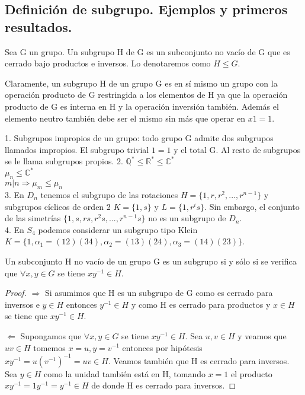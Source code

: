 \subsection{Definición de subgrupo. Ejemplos y primeros resultados.}

\begin{ndef}
Sea G un grupo. Un subgrupo H de G es un subconjunto no vacío de G que es cerrado bajo productos e inversos. Lo denotaremos como $H \le G$.
\end{ndef}

Claramente, un subgrupo H de un grupo G es en sí mismo un grupo con la operación producto de G restringida a los elementos de H ya que la operación producto de G es interna en H y la operación inversión también. Además el elemento neutro también debe ser el mismo sin más que operar en $x 1 = 1$.

\begin{ejemplo}
1. Subgrupos impropios de un grupo: todo grupo G admite dos subgrupos llamados impropios. El subgrupo trivial $1 = {1}$ y el total G. Al resto de subgrupos se le llama subgrupos propios.
2. $\mathbb{Q}^{*} \le \mathbb{R}^{*} \le \mathbb{C}^{*}$\\
$\mu_n \le \mathbb{C}^{*}$\\
$m|n \Rightarrow \mu_m \le \mu_n$\\
3. En $D_n$ tenemos el subgrupo de las rotaciones $H = \{1,r,r^2,...,r^{n-1}\}$ y subgrupos cíclicos de orden 2 $K = \{1,s\}$ y $L = \{1,r^is\}$. Sin embargo, el conjunto de las simetrías $\{1,s,rs,r^2s,...,r^{n-1}s\}$ no es un subgrupo de $D_n$.\\
4. En $S_4$ podemos considerar un subgrupo tipo Klein $K = \{1,\alpha_1 = (12)(34),\alpha_2=(13)(24),\alpha_3=(14)(23)\}$.
\end{ejemplo}

\begin{nprop}\label{proposition:criterio-subgrupo}
Un subconjunto H no vacío de un grupo G es un subgrupo si y sólo si se verifica que
$\forall x,y \in G$ se tiene $xy^{-1} \in H$.
\end{nprop}

\begin{proof}
$\Rightarrow$ Si asumimos que H es un subgrupo de G como es cerrado para inversos e $y \in H$ entonces $y^{-1} \in H$ y como H es cerrado para productos y $x \in H$ se tiene que $xy^{-1} \in H$.

$\Leftarrow$ Supongamos que $\forall x,y \in G$ se tiene $xy^{-1} \in H$. Sea $u,v \in H$ y veamos que $uv \in H$ tomemos $x = u,y = v^{-1}$ entonces por hipótesis $xy^{-1} = u(v^{-1})^{-1} = uv \in H$. Veamos también que H es cerrado para inversos. Sea $y \in H$ como la unidad también está en H, tomando $x = 1$ el producto $xy^{-1} = 1y^{-1} = y^{-1} \in H$ de donde H es cerrado para inversos.
\end{proof}

